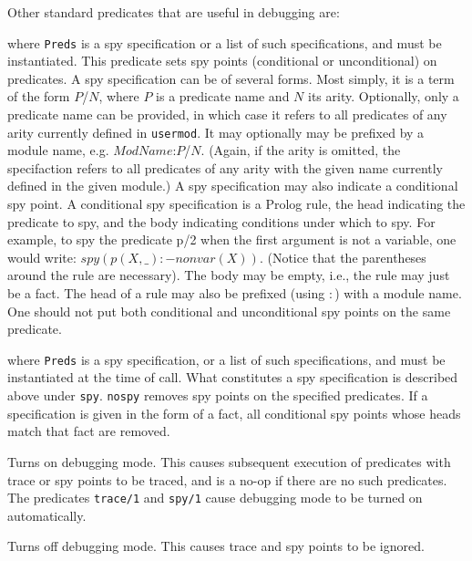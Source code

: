 Other standard predicates that are useful in debugging are:

\begin{description}
 
    where {\tt Preds} is a spy specification or a list of such
    specifications, and must be instantiated. This predicate sets spy
    points (conditional or unconditional) on predicates.  A spy
    specification can be of several forms. Most simply, it is a term
    of the form $P$/$N$, where $P$ is a predicate name and $N$ its
    arity.  Optionally, only a predicate name can be provided, in
    which case it refers to all predicates of any arity currently
    defined in {\tt usermod}.  It may optionally may be prefixed by a
    module name, e.g.  $ModName$:$P$/$N$. (Again, if the arity is
    omitted, the specifaction refers to all predicates of any arity
    with the given name currently defined in the given module.)  A spy
    specification may also indicate a conditional spy point. A
    conditional spy specification is a Prolog rule, the head
    indicating the predicate to spy, and the body indicating
    conditions under which to spy. For example, to spy the predicate
    p/2 when the first argument is not a variable, one would write:
    $spy (p(X,\_):-nonvar(X)).$ (Notice that the parentheses around
    the rule are necessary). The body may be empty, i.e., the rule may
    just be a fact.  The head of a rule may also be prefixed (using
    $:$) with a module name. One should not put both conditional and
    unconditional spy points on the same predicate.

 
    where {\tt Preds} is a spy specification, or a list of such
    specifications, and must be instantiated at the time of call.  What
    constitutes a spy specification is described above under {\tt spy}.
    {\tt nospy} removes spy points on the specified predicates. If a
    specification is given in the form of a fact, all conditional spy points
    whose heads match that fact are removed.

  
    Turns on debugging mode.
    This causes subsequent execution of predicates with trace or spy
    points to be traced, and is a no-op if there are no such predicates.
    The predicates {\tt trace/1} and {\tt spy/1} cause debugging mode
    to be turned on automatically.

 
    Turns off debugging mode.  This causes trace and spy points to be ignored.


\end{description}
